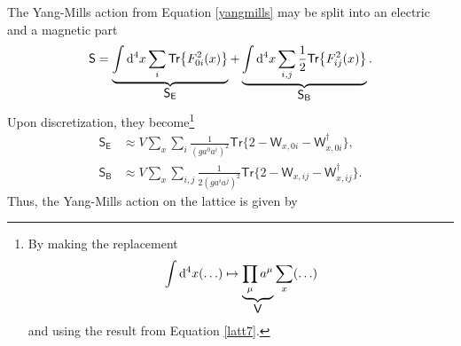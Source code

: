 The Yang-Mills action from Equation \cref{yangmills} may be split into an electric and a magnetic part
\begin{align*}
    \textsf{S}=\underbrace{\int \mathrm{d}^{4}x \sum_{i}\textsf{Tr}\big\{F_{0i}^2(x)\big\}}_{\mathclap{\textstyle \textsf{S}_\textsf{E}}}+\underbrace{\int \mathrm{d}^{4}x\sum_{i, j} \frac{1}{2} \textsf{Tr}\big\{F_{ij}^2(x)\big\}}_{\mathclap{\textstyle \textsf{S}_\textsf{B}}}.
\end{align*}
Upon discretization, they become\footnote{By making the replacement
\begin{align*}
    \int \mathrm{d}^{4}x(\ldots)\mapsto \underbrace{\prod\limits_{\mu}a^\mu}_{\mathclap{\textstyle \textsf{V}}}\sum_x(\ldots)
\end{align*}
and using the result from Equation \cref{latt7}.
}
\begin{align*}
    \textsf{S}_\textsf{E}& \approx V \sum_{x} \sum_{i} \frac{1}{\left(g a^{0} a^{i}\right)^{2}} \textsf{Tr}\big\{2-\textsf{W}_{x, 0 i}-\textsf{W}_{x, 0 i}^{\dagger}\big\}, \\
    \textsf{S}_\textsf{B}& \approx V \sum_{x} \sum_{i, j} \frac{1}{2\left(g a^{i} a^{j}\right)^{2}} \textsf{Tr}\big\{2-\textsf{W}_{x, i j}-\textsf{W}_{x, i j}^{\dagger}\big\}.
\end{align*}
Thus, the Yang-Mills action on the lattice is given by

